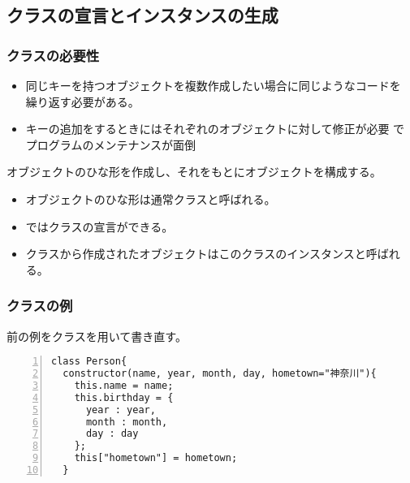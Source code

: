 \subsection{クラスの宣言とインスタンスの生成}
\begin{frame}[containsverbatim]
 \frametitle{クラスの必要性}
 \begin{itemize}
  \item 同じキーを持つオブジェクトを複数作成したい場合に同じようなコードを
繰り返す必要がある。
  \item キーの追加をするときにはそれぞれのオブジェクトに対して修正が必要
        でプログラムのメンテナンスが面倒
 \end{itemize}
 オブジェクトのひな形を作成し、それをもとにオブジェクトを構成する。
 \begin{itemize}
  \item オブジェクトのひな形は通常クラスと呼ばれる。
  \item \ES ではクラスの宣言ができる。
  \item クラスから作成されたオブジェクトはこのクラスのインスタンスと呼ばれる。
 \end{itemize}
\end{frame}
\begin{frame}[containsverbatim]
 \frametitle{クラスの例}
 前の例をクラスを用いて書き直す。
 \begin{Verbatim}[numbers=left]
class Person{
  constructor(name, year, month, day, hometown="神奈川"){
    this.name = name;
    this.birthday = {
      year : year,
      month : month,
      day : day
    };
    this["hometown"] = hometown;
  }
\end{Verbatim}
\end{frame}
